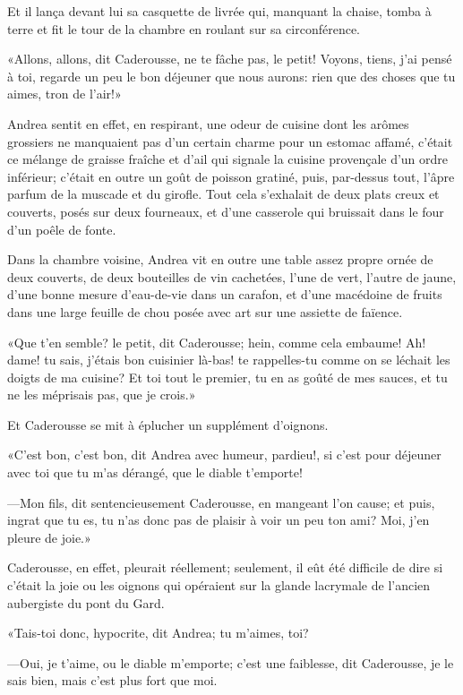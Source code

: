 Et il lança devant lui sa casquette de livrée qui, manquant la chaise, tomba à terre et fit le tour de la chambre en roulant sur sa circonférence. 

«Allons, allons, dit Caderousse, ne te fâche pas, le petit! Voyons, tiens, j'ai pensé à toi, regarde un peu le bon déjeuner que nous aurons: rien que des choses que tu aimes, tron de l'air!» 

Andrea sentit en effet, en respirant, une odeur de cuisine dont les arômes grossiers ne manquaient pas d'un certain charme pour un estomac affamé, c'était ce mélange de graisse fraîche et d'ail qui signale la cuisine provençale d'un ordre inférieur; c'était en outre un goût de poisson gratiné, puis, par-dessus tout, l'âpre parfum de la muscade et du girofle. Tout cela s'exhalait de deux plats creux et couverts, posés sur deux fourneaux, et d'une casserole qui bruissait dans le four d'un poêle de fonte. 

Dans la chambre voisine, Andrea vit en outre une table assez propre ornée de deux couverts, de deux bouteilles de vin cachetées, l'une de vert, l'autre de jaune, d'une bonne mesure d'eau-de-vie dans un carafon, et d'une macédoine de fruits dans une large feuille de chou posée avec art sur une assiette de faïence. 

«Que t'en semble? le petit, dit Caderousse; hein, comme cela embaume! Ah! dame! tu sais, j'étais bon cuisinier là-bas! te rappelles-tu comme on se léchait les doigts de ma cuisine? Et toi tout le premier, tu en as goûté de mes sauces, et tu ne les méprisais pas, que je crois.» 

Et Caderousse se mit à éplucher un supplément d'oignons. 

«C'est bon, c'est bon, dit Andrea avec humeur, pardieu!, si c'est pour déjeuner avec toi que tu m'as dérangé, que le diable t'emporte! 

—Mon fils, dit sentencieusement Caderousse, en mangeant l'on cause; et puis, ingrat que tu es, tu n'as donc pas de plaisir à voir un peu ton ami? Moi, j'en pleure de joie.» 

Caderousse, en effet, pleurait réellement; seulement, il eût été difficile de dire si c'était la joie ou les oignons qui opéraient sur la glande lacrymale de l'ancien aubergiste du pont du Gard. 

«Tais-toi donc, hypocrite, dit Andrea; tu m'aimes, toi? 

—Oui, je t'aime, ou le diable m'emporte; c'est une faiblesse, dit Caderousse, je le sais bien, mais c'est plus fort que moi. 

